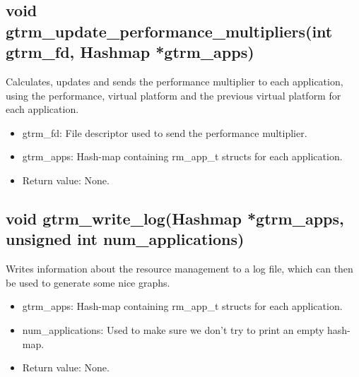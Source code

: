 \documentclass[nobiblatex]{LTHthesis}
\begin{document}
\subsection{void gtrm\_update\_performance\_multipliers(int gtrm\_fd, Hashmap *gtrm\_apps)}
Calculates, updates and sends the performance multiplier to each application, using the performance, virtual platform and the previous virtual platform for each application.
\begin{itemize} 
\item gtrm\_fd: File descriptor used to send the performance multiplier.
\item gtrm\_apps: Hash-map containing rm\_app\_t structs for each application.
\item Return value: None.
\end{itemize}

\subsection{void gtrm\_write\_log(Hashmap *gtrm\_apps, unsigned int num\_applications)}
Writes information about the resource management to a log file, which can then be used to generate some nice graphs.
\begin{itemize} 
\item gtrm\_apps: Hash-map containing rm\_app\_t structs for each application.
\item num\_applications: Used to make sure we don't try to print an empty hash-map.
\item Return value: None.
\end{itemize}
\end{document}
